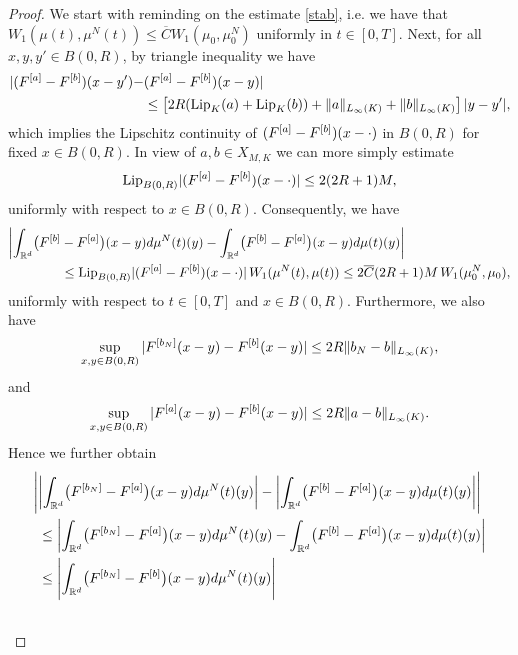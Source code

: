 \begin{proof}
	We start with reminding on the estimate \eqref{stab}, i.e. we have that
	$W_1(\mu(t),\mu^N(t))\leq\overline{C}W_1(\mu_0,\mu_0^N)$ uniformly in $t \in [0,T]$.
	Next, for all $x,y,y' \in B(0,R)$, by triangle inequality we have
	\begin{align*}
		|(F^{[a]} -F^{[b]})(x-y') - &(F^{[a]} -F^{[b]})(x- y)|  \\
			& \leq \left[2R (\textup{Lip}_K(a) + \textup{Lip}_K( b))    +\|a\|_{L_\infty(K)} + \| b\|_{L_\infty(K)} \right] |y-y'|,
	\end{align*}
	which implies the Lipschitz continuity of $(F^{[a]} -F^{[b]})(x- \cdot)$ in $B(0,R)$ for fixed $x\in B(0,R)$. In view of $a,b \in X_{M,K}$ 
	we can more simply estimate
	\begin{equation}\label{lipfafb}
		\textup{Lip}_{B(0,R)}|(F^{[a]} -F^{[b]})(x-\cdot)|\leq 2 (2R+1)M,
	\end{equation}
	uniformly with respect to $x \in B(0,R)$. Consequently, we have
	\begin{align*}
		\biggl|\int_{\mathbb{R}^d}\bigl(F^{[b]}
			&-F^{[a]}\bigr)(x-y)d\mu^{N}(t)(y)-\int_{\mathbb{R}^d}\bigl(F^{[b]}-F^{[a]}\bigr)(x-y)d\mu(t)(y)\biggr|\\
			&\leq\textup{Lip}_{B(0,R)}|(F^{[a]} -F^{[b]})(x-\cdot)|\,W_1(\mu^N(t),\mu(t))
				\leq 2 \overline{C}(2R+1)M\,W_1(\mu_0^N,\mu_0),
	\end{align*}
	uniformly with respect to $t\in [0,T]$ and $x\in B(0,R)$. Furthermore, we also have
	\begin{align}
		\sup_{x,y \in B(0,R)}|F^{[b_{N}]}(x-y)-F^{[b]}(x-y)|\leq 2R \| b_{N}- b\|_{L_\infty(K)},\label{absbounda}
	\end{align}
	and
\begin{align}
	\sup_{x,y \in B(0,R)}|F^{[a]}(x-y)-F^{[b]}(x-y)|	\leq 2R \| a- b\|_{L_\infty(K)}. \label{absbound}
	\end{align}
	Hence we further obtain
	\begin{align} \label{machecazzo}
		\Biggl|
			&\biggl|\int_{\R^d}\bigl(\Fun{b_{N}}-\Fun{a}\bigr)(x-y)d\mu^{N}(t)(y)\biggr| 
				-\biggl|\int_{\R^d}\bigl(\Fun{b}-\Fun{a}\bigr)(x-y)d\mu(t)(y)\biggr|\Biggr|\\ \nonumber
			&\leq\biggl|\int_{\R^d}\bigl(\Fun{b_{N}}-\Fun{a}\bigr)(x-y)d\mu^{N}(t)(y)
					-\int_{\R^d}\bigl(\Fun{b}-\Fun{a}\bigr)(x-y)d\mu(t)(y)\biggr|\\ \nonumber
			&\leq\Biggl|\int_{\R^d}
				\bigl(\Fun{b_{N}}-\Fun{b}\bigr)(x-y)d\mu^{N}(t)(y)\Biggr|\\ \nonumber

\end{align}
\end{proof}
